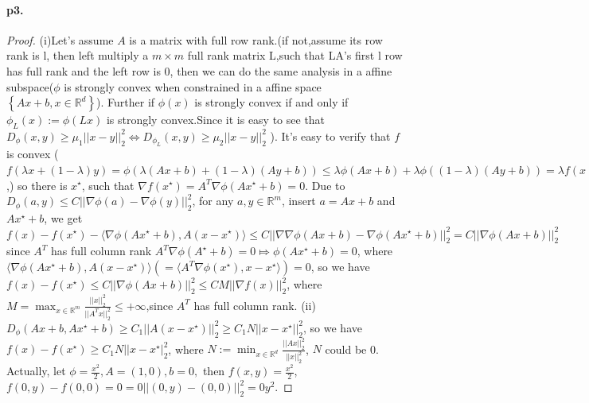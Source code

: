 \documentclass[12pt,a4paper]{article}
\begin{document}
	\paragraph{p3.}
	\begin{proof}
	(i)Let's assume $A$ is a matrix with full row rank.(if not,assume its row rank is l, then left multiply a $m\times m$ full rank matrix L,such that LA's first l row has full rank and the left row is 0, then we can do the same analysis in a affine subspace($\phi$ is strongly convex when constrained in a affine space $\left\{ Ax+b,x\in\mathbb{R}^d\right\}$). Further if $\phi(x)$ is strongly convex if and only if $\phi_{L}(x):=\phi(Lx)$ is strongly convex.Since it is easy to see that
	 $D_{\phi}(x,y)\geq \mu_1 ||x-y||_2^2\Longleftrightarrow D_{\phi_{L}}(x,y)\geq \mu_2 ||x-y||^2_2$ ). It's easy to verify that $f$ is convex
	 ($f(\lambda x+(1-\lambda)y)=\phi(\lambda(Ax+b)+(1-\lambda)(Ay+b))\leq \lambda \phi(Ax+b)+\lambda\phi((1-\lambda)(Ay+b))=\lambda f(x)+(1-\lambda)f(y)$,) so there is $x^{\star}$, such that $\nabla f(x^{\star})=A^T\nabla \phi(Ax^{\star}+b)=0$.
	 Due to $D_{\phi}(a,y)\leq C ||\nabla\phi(a)-\nabla \phi(y)||^2_2$, 
	 for any $a,y\in \mathbb{R}^m$, insert $a=Ax+b$ and $Ax^{\star}+b$, we get $f(x)-f(x^{\star})-\langle\nabla \phi(Ax^{\star}+b),A(x-x^{\star})\rangle\leq C
	  ||\nabla \nabla \phi(Ax+b)-\nabla \phi(Ax^{\star}+b)||^2_2=C||\nabla \phi(Ax+b)||^2_2$ since $A^T$ has full column rank $A^T\nabla\phi(A^{\star}+b)=0\Mapsto \phi(Ax^{\star}+b)=0$, where $\langle\nabla \phi(Ax^{\star}+b),A(x-x^{\star})\rangle(=\langle A^{T}\nabla \phi(x^{\star}), x-x^{\star}\rangle)=0$, so we have $f(x)-f(x^{\star})\leq C||\nabla \phi(Ax+b)||^2_2\leq CM||\nabla f(x)||^2_2$, where $M= \max_{x\in \mathbb{R}^m}\frac{||x||^2_2}{||A^Tx||^2_2}\leq +\infty$,since $A^T$ has full column rank.
	  \newline
	  (ii)$D_{\phi}(Ax+b,Ax^{\star}+b)\geq C_1||A(x-x^{\star})||^2_2\geq {C_1N}||x-x^{\star}||^2_2$, so we have $f(x)-f(x^{\star})\geq {C_1N}||x-x^{\star}|^2_2$, where
	  $N:=\min_{x\in\mathbb{R}^d}\frac{||Ax||^2_2}{||x||^2_2}$, $N$ could be 0. Actually, let $\phi=\frac{x^2}{2}, A=(1,0),b=0,$ then $f(x,y)=\frac{x^2}{2}$, $f(0,y)-f(0,0)=0=0||(0,y)-(0,0)||^2_2=0y^2.$
	  \end{proof}	
\end{document}
